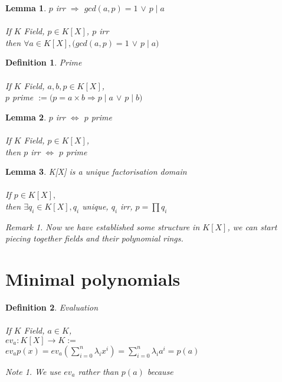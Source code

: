 \documentclass{article}
\theoremstyle{definitionstyle}
\newtheorem{defn}{Definition}[section]
\theoremstyle{lemmastyle}
\newtheorem{lem}{Lemma}[section]
\theoremstyle{remark}
\newtheorem*{note}{Note}
\newtheorem*{remark}{Remark}
\begin{document}
\begin{lem} $p$ irr $\Rightarrow$ $gcd(a,p)=1$ $\lor$ $p\mid a$\\
\\
If $K$ Field, $p \in K[X]$, $p$ irr\\

then $\forall a \in K[X], (gcd(a,p)=1$ $\lor$ $p\mid a)$
\end{lem}

\begin{defn} Prime\\
\\
If $K$ Field, $ a, b, p \in K[X]$,\\

$p$ prime $:= (p = a \times b \Rightarrow p \mid a $ $\lor$ $p \mid b)$
\end{defn}

\begin{lem} $p$ irr $\iff$ $p$ prime\\
\\
If $K$ Field, $p \in K[X]$,\\

then $p$ irr $\iff$ $p$ prime
\end{lem}

\begin{lem} K[X] is a unique factorisation domain\\
\\
If  $p \in K[X],$\\

then $\exists q_i \in K[X], q_i$ unique, $q_i$ irr, $p = \displaystyle \prod q_i$

\begin{remark} Now we have established some structure in $K[X]$, we can start piecing together fields and their polynomial rings. \end{remark}
\end{lem}

\section{Minimal polynomials}
\begin{defn} Evaluation\\
\\
If $K$ Field, $a \in K$,\\

$ev_a : K[X] \to K :=$\\

$ev_a p(x) = ev_a(\sum_{i=0}^{n} \lambda_i x^{i}) = \sum_{i=0}^{n} \lambda_i a^{i} = p(a)$
\begin{note} We use $ev_a$ rather than $p(a)$ because 
\end{note}\end{defn}
\end{document}
